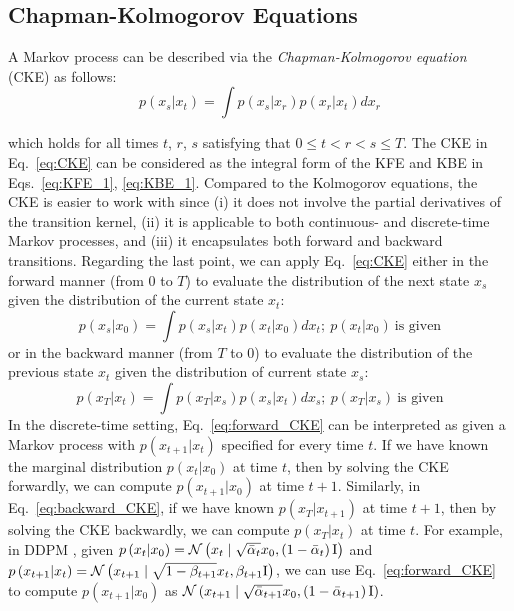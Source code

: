 \subsection{Chapman-Kolmogorov Equations\label{subsec:Chapman-Kolmogorov-Equations} }

A Markov process can be described via the \emph{Chapman-Kolmogorov
equation} (CKE) \cite{karush1961chapman} as follows:
\begin{equation}
p\left(x_{s}|x_{t}\right)=\int p\left(x_{s}|x_{r}\right)p\left(x_{r}|x_{t}\right)dx_{r}\label{eq:CKE}
\end{equation}

\noindent which holds for all times $t$, $r$, $s$ satisfying that
$0\le t<r<s\leq T$. The CKE in Eq.~\ref{eq:CKE} can be considered
as the integral form of the KFE and KBE in Eqs.~\ref{eq:KFE_1},
\ref{eq:KBE_1}. Compared to the Kolmogorov equations, the CKE is
easier to work with since (i) it does not involve the partial derivatives
of the transition kernel, (ii) it is applicable to both continuous-
and discrete-time Markov processes, and (iii) it encapsulates both
forward and backward transitions. Regarding the last point, we can
apply Eq.~\ref{eq:CKE} either in the forward manner (from $0$ to
$T$) to evaluate the distribution of the next state $x_{s}$ given
the distribution of the current state $x_{t}$:
\begin{equation}
p\left(x_{s}|x_{0}\right)=\int p\left(x_{s}|x_{t}\right)p\left(x_{t}|x_{0}\right)dx_{t};\ p\left(x_{t}|x_{0}\right)\ \text{is given}\label{eq:forward_CKE}
\end{equation}
or in the backward manner (from $T$ to $0$) to evaluate the distribution
of the previous state $x_{t}$ given the distribution of current state
$x_{s}$:
\begin{equation}
p\left(x_{T}|x_{t}\right)=\int p\left(x_{T}|x_{s}\right)p\left(x_{s}|x_{t}\right)dx_{s};\ p\left(x_{T}|x_{s}\right)\ \text{is given}\label{eq:backward_CKE}
\end{equation}
In the discrete-time setting, Eq.~\ref{eq:forward_CKE} can be interpreted
as given a Markov process with $p\left(x_{t+1}|x_{t}\right)$ specified
for every time $t$. If we have known the marginal distribution $p\left(x_{t}|x_{0}\right)$
at time $t$, then by solving the CKE forwardly, we can compute $p\left(x_{t+1}|x_{0}\right)$
at time $t+1$. Similarly, in Eq.~\ref{eq:backward_CKE}, if we have
known $p\left(x_{T}|x_{t+1}\right)$ at time $t+1$, then by solving
the CKE backwardly, we can compute $p\left(x_{T}|x_{t}\right)$ at
time $t$. For example, in DDPM \cite{ho2020denoising}, given $p\left(x_{t}|x_{0}\right)=\mathcal{N}\left(x_{t}\mid\sqrt{\bar{\alpha}_{t}}x_{0},\left(1-\bar{\alpha}_{t}\right)\mathrm{I}\right)$
and $p\left(x_{t+1}|x_{t}\right)=\mathcal{N}\left(x_{t+1}\mid\sqrt{1-\beta_{t+1}}x_{t},\beta_{t+1}\mathrm{I}\right)$,
we can use Eq.~\ref{eq:forward_CKE} to compute $p\left(x_{t+1}|x_{0}\right)$
as $\mathcal{N}\left(x_{t+1}\mid\sqrt{\bar{\alpha}_{t+1}}x_{0},\left(1-\bar{\alpha}_{t+1}\right)\mathrm{I}\right)$.

